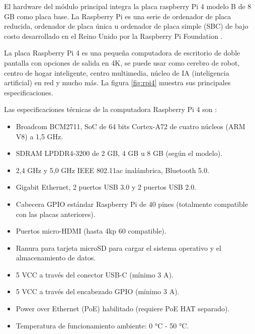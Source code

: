 El hardware del módulo principal integra la placa raspberry Pi 4 modelo B de 8 GB como placa base. La Raspberry Pi es una serie de ordenador de placa reducida, ordenador de placa única u ordenador de placa simple (SBC) de bajo costo desarrollado en el Reino Unido por la Raspberry Pi Foundation \citep{WEBSITE:6}.

La placa Raspberry Pi 4 es una pequeña computadora de escritorio de doble pantalla con opciones de salida en 4K, se puede usar como cerebro de robot, centro de hogar inteligente, centro multimedia, núcleo de IA (inteligencia artificial) en red y mucho más. La figura \ref{fig:rpi4} muestra sus principales especificaciones.

Las especificaciones técnicas de la computadora Raspberry Pi 4 son \citep{WEBSITE:7}:

\begin{itemize}
\item Broadcom BCM2711, SoC de 64 bits Cortex-A72 de cuatro núcleos (ARM V8) a 1,5 GHz.
\item SDRAM LPDDR4-3200 de 2 GB, 4 GB u 8 GB (según el modelo).
\item 2,4 GHz y 5,0 GHz IEEE 802.11ac inalámbrica, Bluetooth 5.0.
\item Gigabit Ethernet, 2 puertos USB 3.0 y 2 puertos USB 2.0.
\item Cabecera GPIO estándar Raspberry Pi de 40 pines (totalmente compatible con las placas anteriores).
\item Puertos micro-HDMI (hasta 4kp 60 compatible).
\item Ranura para tarjeta microSD para cargar el sistema operativo y el almacenamiento de datos.
\item 5 VCC a través del conector USB-C (mínimo 3 A).
\item 5 VCC a través del encabezado GPIO (mínimo 3 A).
\item Power over Ethernet (PoE) habilitado (requiere PoE HAT separado).
\item Temperatura de funcionamiento ambiente: 0 °C - 50 °C.
\end{itemize}


